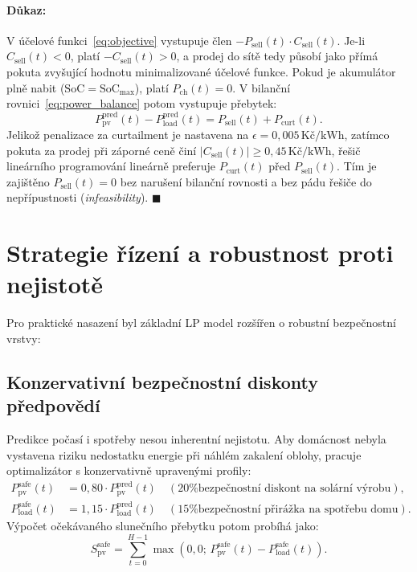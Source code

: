 \documentclass[FM,BP]{tulthesis}
\begin{document}
	\paragraph{Důkaz:}
	V účelové funkci~\eqref{eq:objective} vystupuje člen $-P_{\text{sell}}(t) \cdot C_{\text{sell}}(t)$.
	Je-li $C_{\text{sell}}(t) < 0$, platí $-C_{\text{sell}}(t) > 0$, a prodej do sítě tedy působí jako přímá pokuta zvyšující hodnotu minimalizované účelové funkce.
	Pokud je akumulátor plně nabit ($\mathrm{SoC} = \mathrm{SoC}_{\max}$), platí $P_{\text{ch}}(t) = 0$. V bilanční rovnici~\eqref{eq:power_balance} potom vystupuje přebytek:
	\begin{equation}
		P_{\text{pv}}^{\text{pred}}(t) - P_{\text{load}}^{\text{pred}}(t) = P_{\text{sell}}(t) + P_{\text{curt}}(t).
	\end{equation}
	Jelikož penalizace za curtailment je nastavena na $\epsilon = 0{,}005\,\text{Kč/kWh}$, zatímco pokuta za prodej při záporné ceně činí $|C_{\text{sell}}(t)| \ge 0{,}45\,\text{Kč/kWh}$, řešič lineárního programování lineárně preferuje $P_{\text{curt}}(t)$ před $P_{\text{sell}}(t)$. Tím je zajištěno $P_{\text{sell}}(t) = 0$ bez narušení bilanční rovnosti a bez pádu řešiče do nepřípustnosti (\textit{infeasibility}). \hfill $\blacksquare$

	\section{Strategie řízení a robustnost proti nejistotě}
	\label{sec:strategie}

	Pro praktické nasazení byl základní LP model rozšířen o robustní bezpečnostní vrstvy:

	\subsection{Konzervativní bezpečnostní diskonty předpovědí}
	Predikce počasí i spotřeby nesou inherentní nejistotu. Aby domácnost nebyla vystavena riziku nedostatku energie při náhlém zakalení oblohy, pracuje optimalizátor s konzervativně upravenými profily:
	\begin{align}
		P_{\text{pv}}^{\text{safe}}(t) &= 0{,}80 \cdot P_{\text{pv}}^{\text{pred}}(t) \quad (\text{20\% bezpečnostní diskont na solární výrobu}), \\
		P_{\text{load}}^{\text{safe}}(t) &= 1{,}15 \cdot P_{\text{load}}^{\text{pred}}(t) \quad (\text{15\% bezpečnostní přirážka na spotřebu domu}).
	\end{align}
	Výpočet očekávaného slunečního přebytku potom probíhá jako:
	\begin{equation}
		S_{\text{pv}}^{\text{safe}} = \sum_{t=0}^{H-1} \max \left( 0{,}0; \, P_{\text{pv}}^{\text{safe}}(t) - P_{\text{load}}^{\text{safe}}(t) \right).
	\end{equation}
\end{document}
